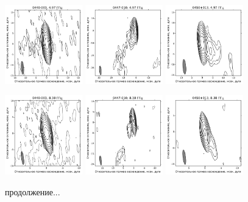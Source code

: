 \begin{figure}
  \includegraphics[width=0.3\textwidth]{0440-003_C.pdf}
  \includegraphics[width=0.3\textwidth]{0447-010_C.pdf}
  \includegraphics[width=0.3\textwidth]{0450+013_C.pdf}


  \includegraphics[width=0.3\textwidth]{0440-003_X.pdf}
  \includegraphics[width=0.3\textwidth]{0447-010_X.pdf}
  \includegraphics[width=0.3\textwidth]{0450+013_X.pdf}

  \caption{продолжение...}
\end{figure}

